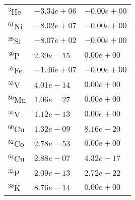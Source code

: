 \begin{tabular}{lll}
 $^{3}$He  & $-3.34e+06 $                                                       & $-0.00e+00 $                                                                    \\
 $^{61}$Ni & $-8.02e+07 $                                                       & $-0.00e+00 $                                                                    \\
 $^{29}$Si & $-8.07e+02 $                                                       & $-0.00e+00 $                                                                    \\
 $^{30}$P  & $2.39e-15 $                                                        & $0.00e+00 $                                                                     \\
 $^{57}$Fe & $-1.46e+07 $                                                       & $-0.00e+00 $                                                                    \\
 $^{53}$V  & $4.01e-14 $                                                        & $0.00e+00 $                                                                     \\
 $^{50}$Mn & $1.06e-27 $                                                        & $0.00e+00 $                                                                     \\
 $^{55}$V  & $1.12e-13 $                                                        & $0.00e+00 $                                                                     \\
 $^{60}$Cu & $1.32e-09 $                                                        & $8.16e-20 $                                                                     \\
 $^{52}$Co & $2.78e-53 $                                                        & $0.00e+00 $                                                                     \\
 $^{64}$Cu & $2.88e-07 $                                                        & $4.32e-17 $                                                                     \\
 $^{33}$P  & $2.09e-13 $                                                        & $2.72e-22 $                                                                     \\
 $^{38}$K  & $8.76e-14 $                                                        & $0.00e+00 $                                                                     \\

\end{tabular}
